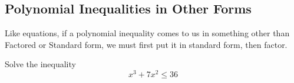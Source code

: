 \subsection{Polynomial Inequalities in Other Forms} 
Like equations, if a polynomial inequality comes to us in something other than Factored or Standard form, we must first put it in standard form, then factor.
\begin{example}
Solve the inequality
\[
x^3+7x^2 \leq 36
\]
\fillpaper
\end{example}